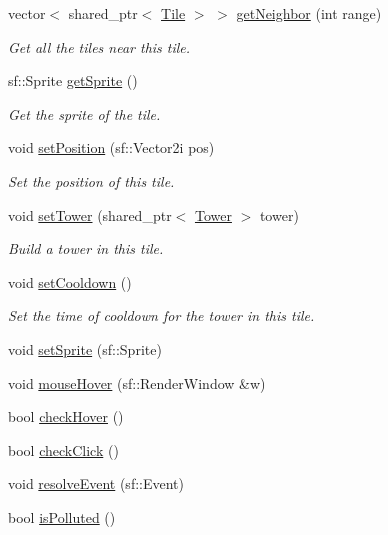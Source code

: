 \begin{DoxyCompactItemize}
vector$<$ shared\+\_\+ptr$<$ \hyperlink{class_tile}{Tile} $>$ $>$ \hyperlink{class_tile_ad468d33f424d564e0b6c2f0c079ea7ab}{get\+Neighbor} (int range)
\begin{DoxyCompactList}\small\item\em Get all the tiles near this tile. \end{DoxyCompactList}\item 
sf\+::\+Sprite \hyperlink{class_tile_af3dec632de42f9e9784af0dce462837c}{get\+Sprite} ()
\begin{DoxyCompactList}\small\item\em Get the sprite of the tile. \end{DoxyCompactList}\item 
void \hyperlink{class_tile_ad49285b0453a229798c64a08a4480de5}{set\+Position} (sf\+::\+Vector2i pos)
\begin{DoxyCompactList}\small\item\em Set the position of this tile. \end{DoxyCompactList}\item 
void \hyperlink{class_tile_a388c6caf78a0c0063b229c2b10eb4e1c}{set\+Tower} (shared\+\_\+ptr$<$ \hyperlink{class_tower}{Tower} $>$ tower)
\begin{DoxyCompactList}\small\item\em Build a tower in this tile. \end{DoxyCompactList}\item 
void \hyperlink{class_tile_a3976735a9d30faa53e03e72aa08b3a2c}{set\+Cooldown} ()
\begin{DoxyCompactList}\small\item\em Set the time of cooldown for the tower in this tile. \end{DoxyCompactList}\item 
void \hyperlink{class_tile_a597689cfa33df779594c888ee1d0875b}{set\+Sprite} (sf\+::\+Sprite)
\item 
void \hyperlink{class_tile_a0ecef130e42783b84e95408689546f8d}{mouse\+Hover} (sf\+::\+Render\+Window \&w)
\item 
bool \hyperlink{class_tile_ad95f62d8b577df5ace5636a14fb59e6e}{check\+Hover} ()
\item 
bool \hyperlink{class_tile_a802ca0ade47efc9b5f28a047a2f98a96}{check\+Click} ()
\item 
void \hyperlink{class_tile_a398b848f0c6ccfd58245a23e19a7ecc9}{resolve\+Event} (sf\+::\+Event)
\item 
bool \hyperlink{class_tile_a9b3edec9eeb02506164d900e8aecb017}{is\+Polluted} ()

\end{DoxyCompactItemize}
